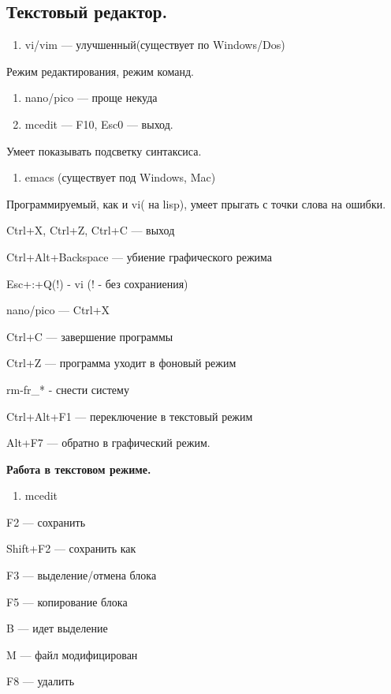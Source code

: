 \subsection {Текстовый редактор.}
\begin{enumerate}
	\item \par 
	vi/vim — улучшенный(существует по
	Windows/Dos)
\end{enumerate}
\par 
Режим редактирования, режим команд.
\begin{enumerate}
	\item \par 
	nano/pico — проще некуда
	\item \par 
	mcedit — F10, Esc0 — выход.
\end{enumerate}
\par 
Умеет показывать подсветку синтаксиса.
\begin{enumerate}
	\item \par 
	emacs (существует под Windows, Mac)
\end{enumerate}
\par 
Программируемый, как и vi( на lisp), умеет
прыгать с точки слова на ошибки.

\par 
  

\par 
Ctrl+X, Ctrl+Z, Ctrl+C — выход 

\par 
Ctrl+Alt+Backspace — убиение графического режима
\par 
Esc+:+Q(!) - vi (! - без сохраниения)
\par 
nano/pico — Ctrl+X 

\par 
Ctrl+C — завершение программы
\par 
Ctrl+Z — программа уходит в фоновый режим
\par 
rm-fr\_* - снести систему 

\par 
Ctrl+Alt+F1 — переключение в текстовый режим
\par 
Alt+F7 — обратно в графический режим.

\par 
\textbf{Работа в текстовом режиме.}
\begin{enumerate}
	\item \par 
	mcedit
\end{enumerate}
\par 
F2 — сохранить
\par 
Shift+F2 — сохранить как
\par 
F3 — выделение/отмена блока
\par 
F5 — копирование блока
\par 
B — идет выделение
\par 
M — файл модифицирован
\par 
F8 — удалить 

